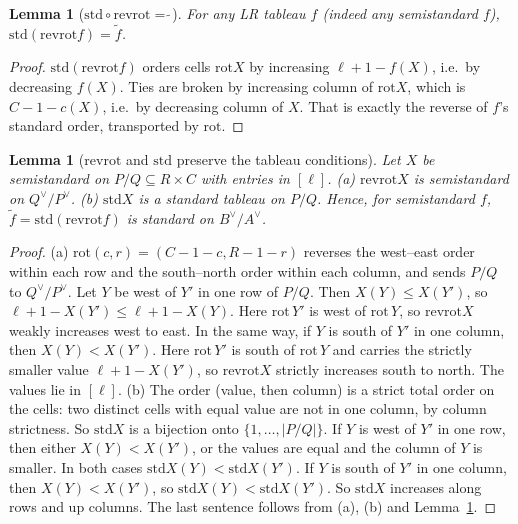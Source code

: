 \documentclass[11pt]{article}
\newtheorem{lemma}[theorem]{Lemma}
\theoremstyle{definition}
\newcommand{\std}{\mathrm{std}}
\newcommand{\rr}{\mathrm{revrot}}
\begin{document}
\begin{lemma}[$\std\circ\rr=\tilde{\ }$]\label{lem:C}
For any LR tableau $f$ (indeed any semistandard $f$), $\std(\rr f)=\tilde f$.
\end{lemma}
\begin{proof}
$\std(\rr f)$ orders cells $\mathrm{rot}X$ by increasing $\ell+1-f(X)$, i.e.\ by decreasing $f(X)$. Ties are broken by increasing
column of $\mathrm{rot}X$, which is $C-1-c(X)$, i.e.\ by decreasing column of $X$. That is exactly the reverse of $f$'s standard
order, transported by $\mathrm{rot}$.
\end{proof}

\begin{lemma}[$\rr$ and $\std$ preserve the tableau conditions]\label{lem:rrstd}
Let $X$ be semistandard on $P/Q\subseteq R\times C$ with entries in $[\ell]$. (a) $\rr X$ is semistandard on $Q^\vee/P^\vee$.
(b) $\std X$ is a standard tableau on $P/Q$. Hence, for semistandard $f$, $\tilde f=\std(\rr f)$ is standard on $B^\vee/A^\vee$.
\end{lemma}
\begin{proof}
(a) $\mathrm{rot}(c,r)=(C-1-c,R-1-r)$ reverses the west--east order within each row and the south--north order within each
column, and sends $P/Q$ to $Q^\vee/P^\vee$. Let $Y$ be west of $Y'$ in one row of $P/Q$. Then $X(Y)\le X(Y')$, so
$\ell+1-X(Y')\le\ell+1-X(Y)$. Here $\mathrm{rot}\,Y'$ is west of $\mathrm{rot}\,Y$, so $\rr X$ weakly increases west to east.
In the same way, if $Y$ is south of $Y'$ in one column, then $X(Y)<X(Y')$. Here $\mathrm{rot}\,Y'$ is south of $\mathrm{rot}\,Y$ and carries the
strictly smaller value $\ell+1-X(Y')$, so $\rr X$ strictly increases south to north. The values lie in $[\ell]$.
(b) The order (value, then column) is a strict total order on the cells: two distinct cells with equal value are not in one
column, by column strictness. So $\std X$ is a bijection onto $\{1,\dots,|P/Q|\}$. If $Y$ is west of $Y'$ in one row, then either
$X(Y)<X(Y')$, or the values are equal and the column of $Y$ is smaller. In both cases $\std X(Y)<\std X(Y')$. If $Y$ is south of
$Y'$ in one column, then $X(Y)<X(Y')$, so $\std X(Y)<\std X(Y')$. So $\std X$ increases along rows and up columns.
The last sentence follows from (a), (b) and Lemma~\ref{lem:C}.
\end{proof}
\end{document}
